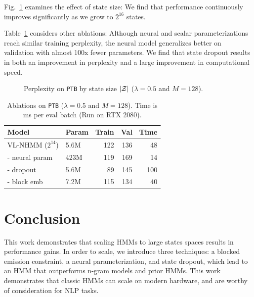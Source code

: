 \documentclass[11pt,a4paper]{article}
\begin{document}
Fig.~\ref{tbl:states-ablation} examines the effect of state size:
We find that performance continuously improves significantly as we grow to $2^{16}$ states.

Table~\ref{tbl:dropout-param-ablation} considers other ablations:
Although neural and scalar parameterizations reach similar training perplexity,
the neural model generalizes better on validation
with almost 100x fewer parameters.
We find that state dropout results in both an improvement in perplexity and
a large improvement in computational speed.

\begin{figure}[!t]
\centering
{}
\caption{\label{tbl:states-ablation}
Perplexity on \texttt{PTB} by state size $|\mathcal{Z}|$ ($\lambda =0.5$ and $M=128$).
}
\end{figure}


\begin{table}[!t]
\centering
\begin{tabular}{llrrr}
\toprule
Model                & Param & Train  & Val  &  Time \\
\midrule
VL-NHMM ($2^{14}$)   & 5.6M & 122    & 136  & 48\\
\quad - neural param & 423M & 119    & 169 & 14\\
\quad - dropout      & 5.6M & 89     & 145  & 100\\
\quad - block emb    & 7.2M & 115    & 134  & 40\\
\bottomrule
\end{tabular}
\caption{\label{tbl:dropout-param-ablation}
Ablations on \texttt{PTB} ($\lambda =0.5$ and $M=128$). 
Time is ms per eval batch (Run on RTX 2080).
}
\end{table}


\section{Conclusion}
This work demonstrates that scaling HMMs to large states spaces results in performance gains.
In order to scale, we introduce three techniques:
a blocked emission constraint, a neural parameterization,
and state dropout, which lead to an HMM that outperforms n-gram models and prior HMMs.
This work demonstrates that classic HMMs can scale on modern hardware,
and are worthy of consideration for NLP tasks. 
\end{document}
